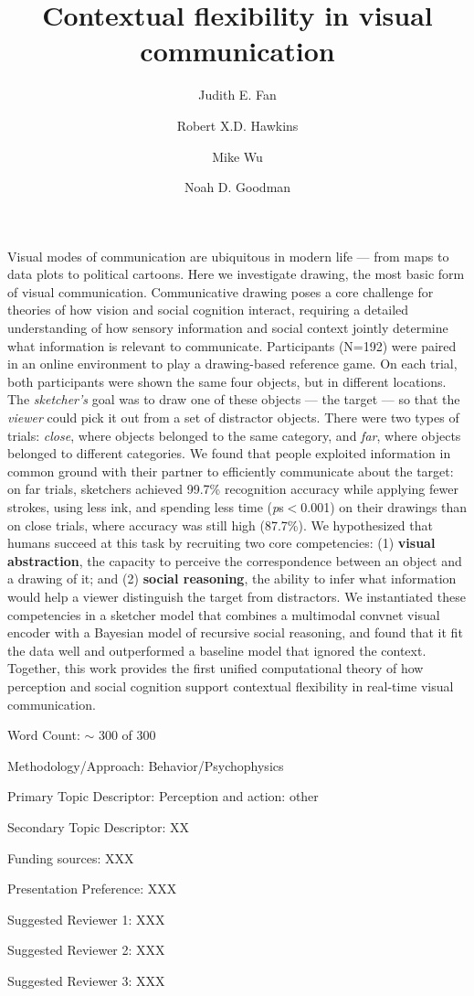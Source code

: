 \documentclass{article}
\title{Contextual flexibility in visual communication}
\author[a]{Judith E. Fan}
\author[a]{Robert X.D. Hawkins}
\author[b]{Mike Wu}
\author[a,b]{Noah D. Goodman}
\affil[a]{Department of Psychology, Stanford University}
\affil[b]{Department of Computer Science, Stanford University}
\begin{document}
\maketitle

Visual modes of communication are ubiquitous in modern life --- from maps to data plots to political cartoons. Here we investigate drawing, the most basic form of visual communication. Communicative drawing poses a core challenge for theories of how vision and social cognition interact, requiring a detailed understanding of how sensory information and social context jointly determine what information is relevant to communicate. Participants (N=192) were paired in an online environment to play a drawing-based reference game. On each trial, both participants were shown the same four objects, but in different locations. The \textit{sketcher's} goal was to draw one of these objects --- the target --- so that the \textit{viewer} could pick it out from a set of distractor objects. There were two types of trials: \textit{close}, where objects belonged to the same category, and \textit{far}, where objects belonged to different categories. We found that people exploited information in common ground with their partner to efficiently communicate about the target: on far trials, sketchers achieved 99.7\% recognition accuracy while applying fewer strokes, using less ink, and spending less time (\textit{p}s$<$0.001) on their drawings than on close trials, where accuracy was still high (87.7\%). We hypothesized that humans succeed at this task by recruiting two core competencies: (1) \textbf{visual abstraction}, the capacity to perceive the correspondence between an object and a drawing of it; and (2) \textbf{social reasoning}, the ability to infer what information would help a viewer distinguish the target from distractors. We instantiated these competencies in a sketcher model that combines a multimodal convnet visual encoder with a Bayesian model of recursive social reasoning, and found that it fit the data well and outperformed a baseline model that ignored the context. Together, this work provides the first unified computational theory of how perception and social cognition support contextual flexibility in real-time visual communication.


\vspace{3mm}

\begin{description}  
\item Word Count: $\sim$ 300 of 300
\item Methodology/Approach: Behavior/Psychophysics
\item Primary Topic Descriptor: Perception and action: other
\item Secondary Topic Descriptor: XX
\item Funding sources: XXX
\item Presentation Preference: XXX
\item Suggested Reviewer 1: XXX
\item Suggested Reviewer 2: XXX
\item Suggested Reviewer 3: XXX
\end{description}
\end{document}
